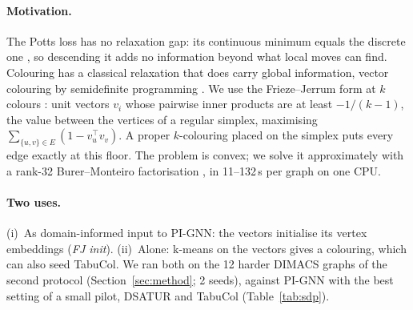\documentclass[11pt]{article}
\begin{document}
\paragraph{Motivation.} The Potts loss has no relaxation gap: its continuous
minimum equals the discrete one \citep{rosenberg1972}, so descending it adds no
information beyond what local moves can find. Colouring has a classical
relaxation that does carry global information, vector colouring by
semidefinite programming \citep{karger1998sdp}. We use the Frieze--Jerrum form
at $k$ colours \citep{frieze1997maxkcut}: unit vectors $v_i$ whose pairwise
inner products are at least $-1/(k-1)$, the value between the vertices of a
regular simplex, maximising $\sum_{\{u,v\}\in E}(1-v_u^{\top}v_v)$. A proper
$k$-colouring placed on the simplex puts every edge exactly at this floor. The
problem is convex; we solve it approximately with a rank-32 Burer--Monteiro
factorisation \citep{burer2003nonlinear}, in 11--132\,s per graph on one CPU.

\paragraph{Two uses.} (i)~As domain-informed input to PI-GNN: the vectors
initialise its vertex embeddings (\emph{FJ init}). (ii)~Alone: k-means on the
vectors gives a colouring, which can also seed TabuCol. We ran both on the 12
harder DIMACS graphs of the second protocol (Section~\ref{sec:method}; 2
seeds), against PI-GNN with the best setting of a small pilot, DSATUR and
TabuCol (Table~\ref{tab:sdp}).
\end{document}
